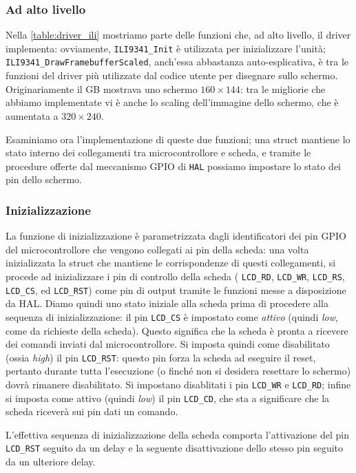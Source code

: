 \documentclass[hidelinks,12pt]{article}
\begin{document}
\subsubsection{Ad alto livello}
Nella \cref{table:driver_ili} mostriamo parte delle funzioni che, ad alto
livello, il driver implementa: ovviamente, \texttt{ILI9341\_Init} è utilizzata
per inizializzare l'unità; \texttt{ILI9341\_DrawFramebufferScaled}, anch'essa
abbastanza auto-esplicativa, è tra le funzioni del driver più utilizzate dal
codice utente per disegnare sullo schermo. Originariamente il GB mostrava uno
schermo $160\times144$: tra le migliorie che abbiamo implementate vi è anche lo
scaling dell'immagine dello schermo, che è aumentata a $320\times240$.

Esaminiamo ora l'implementazione di queste due funzioni; una struct mantiene lo
stato interno dei collegamenti tra microcontrollore e scheda, e tramite le
procedure offerte dal meccanismo GPIO di \texttt{HAL} possiamo impostare lo
stato dei pin dello schermo.

\subsubsection{Inizializzazione}
La funzione di inizializzazione è parametrizzata dagli identificatori dei pin
GPIO del microcontrollore che vengono collegati ai pin della scheda: una volta
inizializzata la struct che mantiene le corrispondenze di questi collegamenti,
si procede ad inizializzare i pin di controllo della scheda ( \texttt{LCD\_RD},
\texttt{LCD\_WR}, \texttt{LCD\_RS}, \texttt{LCD\_CS}, ed \texttt{LCD\_RST}) come
pin di output tramite le funzioni messe a disposizione da HAL. Diamo quindi uno
stato iniziale alla scheda prima di procedere alla sequenza di inizializzazione:
il pin \texttt{LCD\_CS} è impostato come \textit{attivo} (quindi \textit{low},
come da richieste della scheda). Questo significa che la scheda è pronta a
ricevere dei comandi inviati dal microcontrollore. Si imposta quindi come
disabilitato (ossia \textit{high}) il pin \texttt{LCD\_RST}: questo pin forza la
scheda ad eseguire il reset, pertanto durante tutta l'esecuzione (o finché non
si desidera resettare lo schermo) dovrà rimanere disabilitato.
Si impostano disablitati i pin \texttt{LCD\_WR} e \texttt{LCD\_RD}; infine si
imposta come attivo (quindi \textit{low}) il pin \texttt{LCD\_CD}, che sta a
significare che la scheda riceverà sui pin dati un comando.

L'effettiva sequenza di inizializzazione della scheda comporta l'attivazione del
pin \texttt{LCD\_RST} seguito da un delay  e la seguente disattivazione dello
stesso pin seguito da un ulteriore delay.
\end{document}
